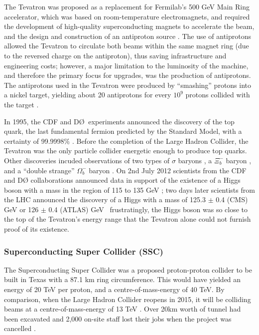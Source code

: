The Tevatron was proposed as a replacement for Fermilab's 500 GeV Main Ring accelerator, which was based on room-temperature electromagnets, and required the development of high-quality superconducting magnets to accelerate the beam, and the design and construction of an antiproton source \cite{Tevatron:Retrospective:Online}. The use of antiprotons allowed the Tevatron to circulate both beams within the same magnet ring (due to the reversed charge on the antiproton), thus saving infrastructure and engineering costs; however, a major limitation to the luminosity of the machine, and therefore the primary focus for upgrades, was the production of antiprotons. The antiprotons used in the Tevatron were produced by ``smashing'' protons into a nickel target, yielding about 20 antiprotons for every $10^{9}$ protons collided with the target \cite{Tevatron:Antiprotons:Online}.

In 1995, the CDF and D\O$\:$ experiments announced the discovery of the top quark, the last fundamental fermion predicted by the Standard Model, with a certainty of 99.9998\% \cite{PhysRevLett:Top1,PhysRevLett:Top2}. Before the completion of the Large Hadron Collider, the Tevatron was the only particle collider energetic enough to produce top quarks. Other discoveries incuded observations of two types of $\sigma$ baryons \cite{Fermi:Sigma:Online}, a $\Xi_{b}^{-}$ baryon \cite{Fermi:Xi:Online}, and a ``double strange'' $\Omega_{b}^{-}$ baryon \cite{PhysRevLett:Omega}. On 2nd July 2012 scientists from the CDF and D\O\: collaborations announced data in support of the existence of a Higgs boson with a mass in the region of 115 to 135 GeV \cite{Fermi:Higgs:Online}; two days later scientists from the LHC announced the discovery of a Higgs with a mass of 125.3 $\pm$ 0.4 (CMS) GeV \cite{PhysLettB:Higgs:CMS} or 126 $\pm$ 0.4 (ATLAS) GeV \cite{PhysLettB:Higgs:ATLAS} \textemdash \, frustratingly, the Higgs boson was so close to the top of the Tevatron's energy range that the Tevatron alone could not furnish proof of its existence.

\subsubsection{Superconducting Super Collider (SSC)}
The Superconducting Super Collider was a proposed proton-proton \cite{SSC:LAT:Online} collider to be built in Texas with a 87.1 km ring circumference. This would have yielded an energy of 20 TeV per proton, and a centre-of-mass-energy of 40 TeV. By comparison, when the Large Hadron Collider reopens in 2015, it will be colliding beams at a centre-of-mass-energy of 13 TeV \cite{LHC:14TeV:Online}. Over 20km worth of tunnel had been excavated and 2,000 on-site staff lost their jobs when the project was cancelled \cite{SSC:Sun:Online}.

